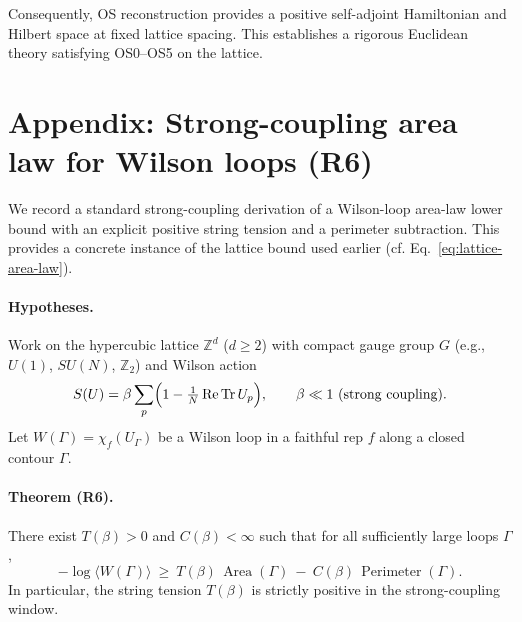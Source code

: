 \documentclass[11pt]{amsart}
\begin{document}
Consequently, OS reconstruction provides a positive self-adjoint Hamiltonian and Hilbert space at fixed lattice spacing. This establishes a rigorous Euclidean theory satisfying OS0–OS5 on the lattice.

\section{Appendix: Strong-coupling area law for Wilson loops (R6)}

We record a standard strong-coupling derivation of a Wilson-loop area-law lower bound with an explicit positive string tension and a perimeter subtraction. This provides a concrete instance of the lattice bound used earlier (cf. Eq.~\eqref{eq:lattice-area-law}).

\paragraph{Hypotheses.}
Work on the hypercubic lattice $\mathbb{Z}^d$ ($d\ge 2$) with compact gauge group $G$ (e.g., $U(1)$, $SU(N)$, $\mathbb{Z}_2$) and Wilson action
\[
  S(U)=\beta \sum_{p} \Bigl(1-\tfrac{1}{N}\operatorname{Re}\operatorname{Tr} U_p\Bigr),\qquad \beta\ll 1\ \text{(strong coupling)}.
\]
Let $W(\Gamma)=\chi_f(U_\Gamma)$ be a Wilson loop in a faithful rep $f$ along a closed contour $\Gamma$.

\paragraph{Theorem (R6).}
There exist $T(\beta)>0$ and $C(\beta)<\infty$ such that for all sufficiently large loops $\Gamma$,
\[
  -\log \langle W(\Gamma)\rangle\ \ge\ T(\beta)\,\operatorname{Area}(\Gamma)\ -\ C(\beta)\,\operatorname{Perimeter}(\Gamma).
\]
In particular, the string tension $T(\beta)$ is strictly positive in the strong-coupling window.
\end{document}
